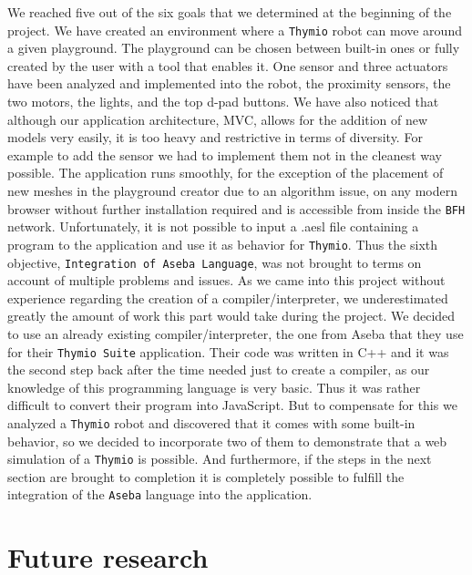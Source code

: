 \documentclass{scrbook}
\begin{document}
We reached five out of the six goals that we determined at the beginning of the project. We have created an environment where a \texttt{Thymio} robot can move around a given playground. The playground can be chosen between built-in ones or fully created by the user with a tool that enables it. 
One sensor and three actuators have been analyzed and implemented into the robot, the proximity sensors, the two motors, the lights, and the top d-pad buttons. We have also noticed that although our application architecture, MVC, allows for the addition of new models very easily, it is too heavy and restrictive in terms of diversity. 
For example to add the sensor we had to implement them not in the cleanest way possible. The application runs smoothly, for the exception of the placement of new meshes in the playground creator due to an algorithm issue, 
on any modern browser without further installation required and is accessible from inside the \texttt{BFH} network. Unfortunately, it is not possible to input a .aesl file containing a program to the application and use it as behavior for \texttt{Thymio}. 
Thus the sixth objective, \texttt{Integration of Aseba Language}, was not brought to terms on account of multiple problems and issues. As we came into this project without experience regarding the creation of a compiler/interpreter, we underestimated greatly the amount of work this part would take during the project. 
We decided to use an already existing compiler/interpreter, the one from Aseba that they use for their \texttt{Thymio Suite} application. Their code was written in C++ and it was the second step back after the time needed just to create a compiler, as our knowledge of this programming language is very basic. 
Thus it was rather difficult to convert their program into JavaScript. But to compensate for this we analyzed a \texttt{Thymio} robot and discovered that it comes with some built-in behavior, so we decided to incorporate two of them to demonstrate that a web simulation of a \texttt{Thymio} is possible. 
And furthermore, if the steps in the next section are brought to completion it is completely possible to fulfill the integration of the \texttt{Aseba} language into the application.

\section{Future research \label{future}}
\end{document}
